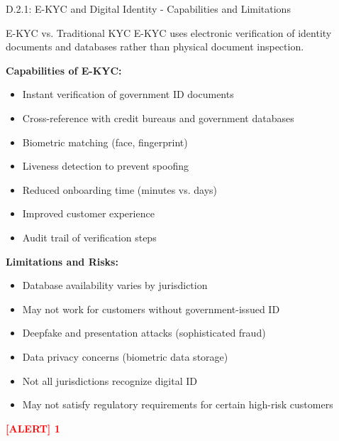 \documentclass[11pt,a4paper]{beamer}
\newcommand{\redflag}[1]{\textcolor{red}{\textbf{[ALERT] 1}}}
\begin{document}
\begin{frame}{D.2.1: E-KYC and Digital Identity - Capabilities and Limitations}
	\begin{block}{E-KYC vs. Traditional KYC}
		E-KYC uses electronic verification of identity documents and databases rather than physical document inspection.
	\end{block}
	\textbf{Capabilities of E-KYC:}
	\begin{itemize}
		\item Instant verification of government ID documents
		\item Cross-reference with credit bureaus and government databases
		\item Biometric matching (face, fingerprint)
		\item Liveness detection to prevent spoofing
		\item Reduced onboarding time (minutes vs. days)
		\item Improved customer experience
		\item Audit trail of verification steps
	\end{itemize}
	\textbf{Limitations and Risks:}
	\begin{itemize}
		\item Database availability varies by jurisdiction
		\item May not work for customers without government-issued ID
		\item Deepfake and presentation attacks (sophisticated fraud)
		\item Data privacy concerns (biometric data storage)
		\item Not all jurisdictions recognize digital ID
		\item May not satisfy regulatory requirements for certain high-risk customers
	\end{itemize}
	\redflag{E-KYC may be insufficient for high-risk customers or PEPs - EDD still required.}
\end{frame}
\end{document}

